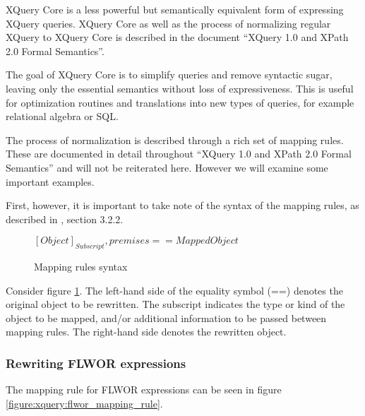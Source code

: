 XQuery Core is a less powerful but semantically equivalent form of expressing
XQuery queries. XQuery Core as well as the process of normalizing regular
XQuery to XQuery Core is described in the document ``XQuery 1.0 and XPath 2.0
Formal Semantics''\cite{xquery_semantics}.

The goal of XQuery Core is to simplify queries and remove syntactic sugar,
leaving only the essential semantics without loss of expressiveness.
This is useful for optimization routines and translations into new types of
queries, for example relational algebra or SQL.

The process of normalization is described through a rich set of mapping
rules. These are documented in detail throughout ``XQuery 1.0 and XPath 2.0
Formal Semantics''\cite{xquery_semantics} and will not be reiterated here.
However we will examine some important examples.

First, however, it is important to take note of the syntax of the mapping
rules, as described in \cite{xquery_semantics}, section 3.2.2. 
 
\begin{figure}[!h]
  \centering
$
[Object]_{Subscript}, premises == Mapped Object
$
  \caption{Mapping rules syntax}
  \label{figure:xquery:mapping_rules}
\end{figure}

Consider figure \ref{figure:xquery:mapping_rules}. The left-hand side of the
equality symbol (==) denotes the original object to be rewritten. The
subscript indicates the type or kind of the object to be mapped, and/or
additional information to be passed between mapping rules. The right-hand side
denotes the rewritten object.

\subsubsection{Rewriting FLWOR expressions}
The mapping rule for FLWOR expressions can be seen in figure
\ref{figure:xquery:flwor_mapping_rule}.

%

